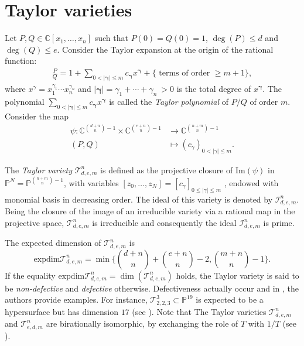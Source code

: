 \documentclass[letterpaper,11pt]{amsart}
\theoremstyle{plain}
\theoremstyle{definition}
\newcommand{\enm}[1]{\ensuremath{#1}}          %
\newcommand{\tv}{\mathcal{T}}
\newcommand{\PP}{\enm{\mathbb{P}}}
\newcommand{\C}{\mathbb{C}}
\newcommand{\ed}{\mathrm{exp dim}}
\begin{document}
\section{Taylor varieties}\label{section: taylor}
Let $P, Q \in \mathbb{C}[x_1,\dots,x_n]$ such that $P(0)=Q(0)=1$, $\deg(P)\leq d$ and $\deg(Q)\leq e$. Consider the Taylor expansion at the origin  of the rational function:   
\begin{align}\label{a: rat}
\frac{P}{Q}=1+\sum_{0<|\bm{\gamma}| \leq m}c_{\bm{\gamma}}x^{\bm{\gamma}} +  \{\text{ terms of order } \geq m+1\},   
\end{align}
where $x^\gamma=x_1^{\gamma_1}\cdots x_n^{\gamma_n}$ and $|\bm{\gamma}|=\gamma_1+\cdots+\gamma_n\ > 0$ is the total degree of $x^{\bm{\gamma}}$. The polynomial $\sum_{0<|\bm{\gamma}| \leq m}c_{\bm{\gamma}}x^{\bm{\gamma}}$ is called the \emph{Taylor polynomial} of $P/Q$ of order $m$.   Consider the map 
\begin{align*}
\psi: \C^{{d+n \choose n}-1} \times \C^{{e+n \choose n}-1} &\to \mathbb{C}^{{n+m \choose n}-1}   \\ 
(P,Q) &\mapsto (c_{\gamma})_{0<|\gamma| \leq m}.
\end{align*}

The \textit{Taylor variety} $\mathcal{T}^n_{d,e,m}$ is defined as the projective closure of $\mathrm{Im}(\psi)$ in $\mathbb{P}^N=\mathbb{P}^{{n+m \choose n}-1}$, with variables $[z_0,\dots,z_N]=[c_{\gamma}]_{0\leq |\gamma| \leq m}$ , endowed with monomial basis in decreasing order.
The ideal of this variety is denoted by $\mathcal{I}_{d,e,m}^{n}.$ Being the closure of the image of an irreducible variety via a rational map in the projective space, $\mathcal{T}^n_{d,e,m}$ is irreducible and consequently the ideal $\mathcal{I}_{d,e,m}^{n}$ is prime.

The expected dimension of $\mathcal{T}^n_{d,e,m}$ is  $$
\ed{\tv^n_{d,e,m}}=\min\bigg\{{d+n \choose n}+{e+n \choose n}-2,{m+n \choose n}-1\bigg\}.
$$
If the equality $\ed{\tv^n_{d,e,m}}=\dim(\tv^n_{d,e,m})$ holds, the Taylor variety is said to be \emph{non-defective} and \emph{defective} otherwise.     
Defectiveness actually occur and  in \cite{TV23}, the authors  provide examples. For instance, $\tv^3_{2,2,3}\subset \PP^{19}$ is expected to be a hypersurface but has dimension $17$ (see \cite[Proposition 4.1]{TV23}). Note that The Taylor varieties $\tv^n_{d,e,m}$ and $\tv^n_{e,d,m}$   are birationally isomorphic, by exchanging the role of $T$ with $1/T$ (see \cite[Proposition 5.2]{TV23}). 
\end{document}

